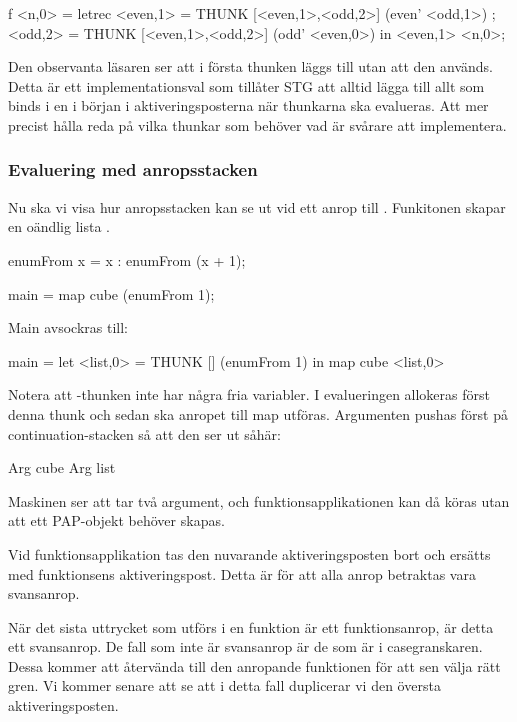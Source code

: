 \documentclass[../Core]{subfiles}
\begin{document}
\begin{codeEx}
f <n,0> = letrec 
    { <even,1> = THUNK [<even,1>,<odd,2>] (even' <odd,1>)
    ; <odd,2>  = THUNK [<even,1>,<odd,2>] (odd' <even,0>)
    } in <even,1> <n,0>;
\end{codeEx}

Den observanta läsaren ser att i första thunken läggs  till utan att den används. 
Detta är ett implementationsval som tillåter STG att alltid lägga till allt som 
binds i en  i början i aktiveringsposterna när thunkarna ska evalueras. 
Att mer precist hålla reda på vilka thunkar som behöver vad är svårare att implementera.




\subsubsection{Evaluering med anropsstacken}



Nu ska vi visa hur anropsstacken kan se ut vid ett anrop till . Funkitonen
  skapar en oändlig lista \ic{[x, x+1, x+2, ...]}.
\begin{codeEx}
enumFrom x = x : enumFrom (x + 1);

main = map cube (enumFrom 1);
\end{codeEx}

Main avsockras till:
\begin{codeEx}
main = let <list,0> = THUNK [] (enumFrom 1)
       in  map cube <list,0>
\end{codeEx}



Notera att -thunken inte har några fria variabler.
I evalueringen allokeras först denna thunk och sedan ska anropet till map
utföras. 
Argumenten pushas först på continuation-stacken så att den ser ut såhär:
\begin{codeEx}
Arg cube
Arg list
\end{codeEx}

Maskinen ser att  tar två argument, och funktionsapplikationen 
kan då köras utan att ett PAP-objekt behöver skapas.

Vid funktionsapplikation tas den nuvarande aktiveringsposten bort och ersätts 
med funktionsens aktiveringspost. Detta är för att alla anrop betraktas vara
svansanrop.

När det sista uttrycket som utförs i en funktion är ett funktionsanrop, är
detta ett svansanrop. De fall som inte är svansanrop
är de som är i casegranskaren. Dessa kommer att återvända till den anropande
funktionen för att sen välja rätt gren. Vi kommer senare att se att i detta
fall duplicerar vi den översta aktiveringsposten. 
\end{document}
